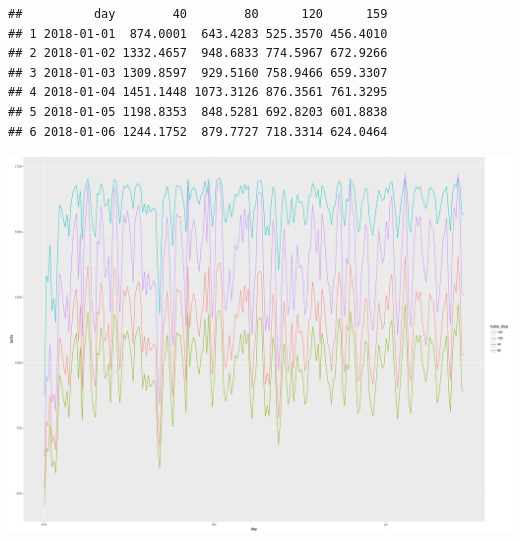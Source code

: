 \documentclass{article}\usepackage[]{graphicx}\usepackage[]{color}
\makeatletter
\def\maxwidth{ %
  \ifdim\Gin@nat@width>\linewidth
    \linewidth
  \else
    \Gin@nat@width
  \fi
}
\newenvironment{kframe}{%
 \def\at@end@of@kframe{}%
 \ifinner\ifhmode%
  \def\at@end@of@kframe{\end{minipage}}%
  \begin{minipage}{\columnwidth}%
 \fi\fi%
 \def\FrameCommand##1{\hskip\@totalleftmargin \hskip-\fboxsep
 \colorbox{shadecolor}{##1}\hskip-\fboxsep
     \hskip-\linewidth \hskip-\@totalleftmargin \hskip\columnwidth}%
 \MakeFramed {\advance\hsize-\width
   \@totalleftmargin\z@ \linewidth\hsize
   \@setminipage}}%
 {\par\unskip\endMakeFramed%
 \at@end@of@kframe}
\newenvironment{knitrout}{}{} %
\makeatother
\begin{document}
\begin{knitrout}
\color{fgcolor}\begin{kframe}
\begin{verbatim}
##          day        40        80      120      159
## 1 2018-01-01  874.0001  643.4283 525.3570 456.4010
## 2 2018-01-02 1332.4657  948.6833 774.5967 672.9266
## 3 2018-01-03 1309.8597  929.5160 758.9466 659.3307
## 4 2018-01-04 1451.1448 1073.3126 876.3561 761.3295
## 5 2018-01-05 1198.8353  848.5281 692.8203 601.8838
## 6 2018-01-06 1244.1752  879.7727 718.3314 624.0464
\end{verbatim}
\end{kframe}
\includegraphics[width=\maxwidth]{figures/Pricing_graph-1} 

\end{knitrout}
\end{document}
